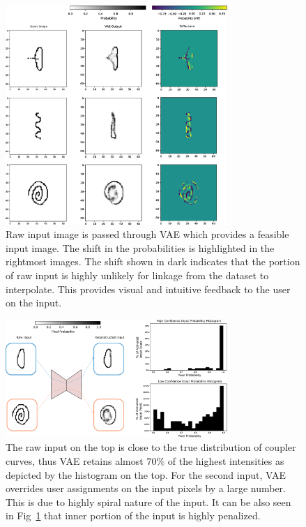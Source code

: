 \begin{figure}
\centering
\includegraphics[width=0.75\textwidth]{idetc-20/figure/probability_shift.eps}
  \caption{Raw input image is passed through VAE which provides a feasible input image. The shift in the probabilities is highlighted in the rightmost images. The shift shown in dark indicates that the portion of raw input is highly unlikely for linkage from the dataset to interpolate. This provides visual and intuitive feedback to the user on the input.}
\label{fig_prob_shift_effect}
\end{figure}

\begin{figure}
\centering
\includegraphics[width=0.75\textwidth]{idetc-20/figure/high_low_confidence_feedback_new.eps}
  \caption{The raw input on the top is close to the true distribution of coupler curves, thus VAE retains almost $70\%$ of the highest intensities as depicted by the histogram on the top. For the second input, VAE overrides user assignments on the input pixels by a large number. This is due to highly spiral nature of the input. It can be also seen in Fig~\ref{fig_prob_shift_effect} that inner portion of the input is highly penalized. }
\label{fig_two_inputs}
\end{figure}

